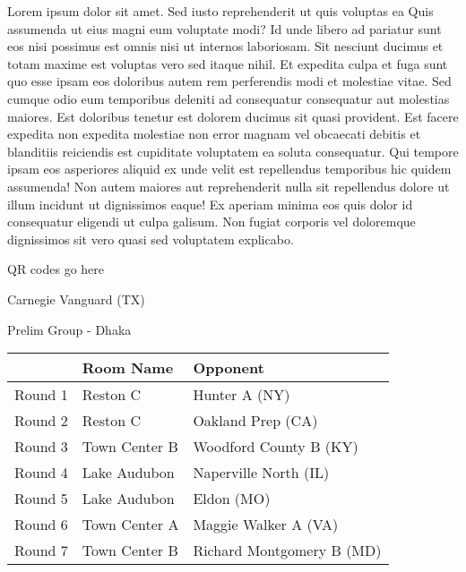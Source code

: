 \documentclass{article}%
\begin{document}
\vspace*{8pt}%
\linebreak%
\newline%
\newline%
Lorem ipsum dolor sit amet. Sed iusto reprehenderit ut quis voluptas ea Quis assumenda ut eius magni eum voluptate modi? Id unde libero ad pariatur sunt eos nisi possimus est omnis nisi ut internos laboriosam. Sit nesciunt ducimus et totam maxime est voluptas vero sed itaque nihil. Et expedita culpa et fuga sunt quo esse ipsam eos doloribus autem rem perferendis modi et molestiae vitae.\newline%
\newline%
Sed cumque odio eum temporibus deleniti ad consequatur consequatur aut molestias maiores. Est doloribus tenetur est dolorem ducimus sit quasi provident. Est facere expedita non expedita molestiae non error magnam vel obcaecati debitis et blanditiis reiciendis est cupiditate voluptatem ea soluta consequatur. Qui tempore ipsam eos asperiores aliquid ex unde velit est repellendus temporibus hic quidem assumenda!\newline%
\newline%
Non autem maiores aut reprehenderit nulla sit repellendus dolore ut illum incidunt ut dignissimos eaque! Ex aperiam minima eos quis dolor id consequatur eligendi ut culpa galisum. Non fugiat corporis vel doloremque dignissimos sit vero quasi sed voluptatem explicabo.\newline%
\newline%
%
\vspace*{30pt}%
\begin{center}%
\begin{Huge}%
QR codes go here%
\end{Huge}%
\end{center}%
\newpage%
%
\begin{center}%
\begin{Huge}%
Carnegie Vanguard (TX)%
\end{Huge}%
\vspace*{8pt}%
\linebreak%
\begin{Large}%
Prelim Group {-} Dhaka%
\end{Large}%
\end{center}%
\begin{tabularx}{\textwidth}{|c|Y|Y|}%
\hline%
&Room Name&Opponent\\%
\hline%
Round 1&Reston C&Hunter A (NY)\\%
Round 2&Reston C&Oakland Prep (CA)\\%
Round 3&Town Center B&Woodford County B (KY)\\%
Round 4&Lake Audubon&Naperville North (IL)\\%
Round 5&Lake Audubon&Eldon (MO)\\%
Round 6&Town Center A&Maggie Walker A (VA)\\%
Round 7&Town Center B&Richard Montgomery B (MD)\\%
\hline%
\end{tabularx}%
\end{document}
